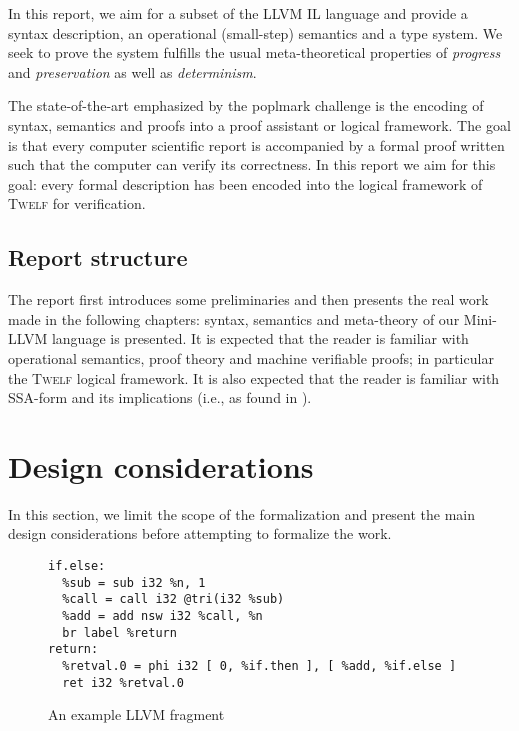 \documentclass[a4paper, oneside, 10pt, draft]{memoir}
\newcommand{\twelf}{\textsc{Twelf}}
\begin{document}
In this report, we aim for a subset of the LLVM IL language and
provide a syntax description, an operational (small-step) semantics and a type
system. We seek to prove the system fulfills the usual meta-theoretical
properties of \emph{progress} and \emph{preservation} as well as
\emph{determinism}.

The state-of-the-art emphasized by the poplmark
challenge\cite{aydemir:2005:mechanizedmetatheory} is the encoding of
syntax, semantics and proofs into a proof assistant or logical
framework. The goal is that every computer scientific report is
accompanied by a formal proof written such that the computer can
verify its correctness. In this report we aim for this goal: every
formal description has been encoded into the logical framework of
\twelf{}\cite{schurmann.pfenning:twelf} for verification.

\section{Report structure}

The report first introduces some preliminaries and then presents the
real work made in the following chapters: syntax, semantics and
meta-theory of our Mini-LLVM language is presented. It is expected
that the reader is familiar with operational semantics, proof theory
and machine verifiable proofs; in particular the \twelf{} logical
framework. It is also expected that the reader is familiar with
SSA-form and its implications (i.e., as found in
\cite[Chapter 19]{appel:1998:modern}).

\chapter{Design considerations}

In this section, we limit the scope of the formalization and present
the main design considerations before attempting to formalize the work.

\begin{figure}
\begin{verbatim}
if.else:
  %sub = sub i32 %n, 1
  %call = call i32 @tri(i32 %sub)
  %add = add nsw i32 %call, %n
  br label %return
return:
  %retval.0 = phi i32 [ 0, %if.then ], [ %add, %if.else ]
  ret i32 %retval.0

\end{verbatim}
  \caption{An example LLVM fragment}
  \label{fig:llvm-example-1}
\end{figure}
\end{document}
